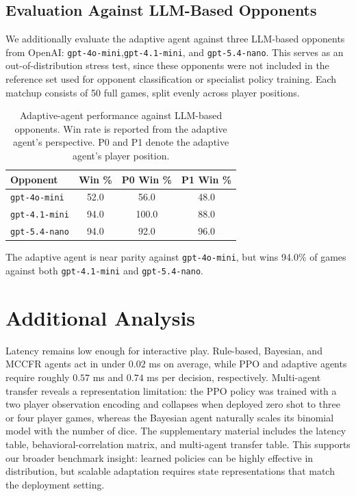 \documentclass[letterpaper]{article} %
\begin{document}
\subsection{Evaluation Against LLM-Based Opponents}

We additionally evaluate the adaptive agent against three LLM-based opponents from OpenAI:
\texttt{gpt-4o-mini},\linebreak \texttt{gpt-4.1-mini}, and \texttt{gpt-5.4-nano}. This serves as an out-of-distribution stress test, since these opponents were not included in the reference set used for opponent classification or specialist policy training. Each matchup consists of 50 full games, split evenly across player positions.

\begin{table}[t]
\centering
\small
\begin{tabular}{lccc}
\hline
Opponent  & Win \% & P0 Win \% & P1 Win \%  \\
\hline
\texttt{gpt-4o-mini}   & 52.0  & 56.0 & 48.0   \\
\texttt{gpt-4.1-mini}  & 94.0  & 100.0 & 88.0 \\
\texttt{gpt-5.4-nano}  & 94.0 & 92.0 & 96.0   \\
\hline
\end{tabular}
\caption{
Adaptive-agent performance against LLM-based opponents. Win rate is reported
from the adaptive agent's perspective. P0 and P1 denote the adaptive agent's
player position.
}
\label{tab:llm_opponents}
\end{table}

The adaptive agent is near parity against \texttt{gpt-4o-mini}, but wins
94.0\% of games against both \texttt{gpt-4.1-mini} and \texttt{gpt-5.4-nano}.





\section{Additional Analysis}
Latency remains low enough for interactive play. Rule-based, Bayesian, and MCCFR agents act in under $0.02$ ms on average, while PPO and adaptive agents require roughly $0.57$ ms and $0.74$ ms per decision, respectively. Multi-agent transfer reveals a representation limitation: the PPO policy was trained with a two player observation encoding and collapses when deployed zero shot to three or four player games, whereas the Bayesian agent naturally scales its binomial model with the number of dice. The supplementary material includes the latency table, behavioral-correlation matrix, and multi-agent transfer table. This supports our broader benchmark insight: learned policies can be highly effective in distribution, but scalable adaptation requires state representations that match the deployment setting.
\end{document}
